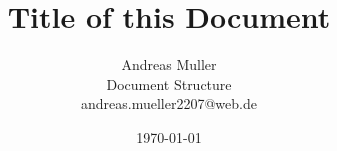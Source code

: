 \documentclass[11pt,a4paper,titlepage,twocolumn]{article}
\begin{document}
\title{Title of this Document}
\author{Andreas Muller \\ \LaTex Document Structure \\ andreas.mueller2207@web.de}
\date{\today}
\maketitle


\lipsum
\end{document}

